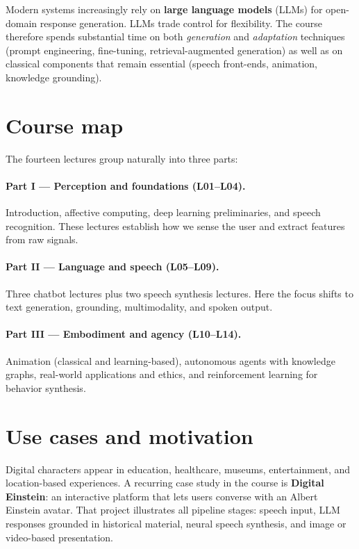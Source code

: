 Modern systems increasingly rely on \textbf{large language models} (LLMs) for open-domain response generation. LLMs trade control for flexibility. The course therefore spends substantial time on both \emph{generation} and \emph{adaptation} techniques (prompt engineering, fine-tuning, retrieval-augmented generation) as well as on classical components that remain essential (speech front-ends, animation, knowledge grounding).

\section{Course map}

The fourteen lectures group naturally into three parts:

\paragraph{Part I --- Perception and foundations (L01--L04).}
Introduction, affective computing, deep learning preliminaries, and speech recognition. These lectures establish how we sense the user and extract features from raw signals.

\paragraph{Part II --- Language and speech (L05--L09).}
Three chatbot lectures plus two speech synthesis lectures. Here the focus shifts to text generation, grounding, multimodality, and spoken output.

\paragraph{Part III --- Embodiment and agency (L10--L14).}
Animation (classical and learning-based), autonomous agents with knowledge graphs, real-world applications and ethics, and reinforcement learning for behavior synthesis.

\section{Use cases and motivation}

Digital characters appear in education, healthcare, museums, entertainment, and location-based experiences. A recurring case study in the course is \textbf{Digital Einstein}: an interactive platform that lets users converse with an Albert Einstein avatar. That project illustrates all pipeline stages: speech input, LLM responses grounded in historical material, neural speech synthesis, and image or video-based presentation.

